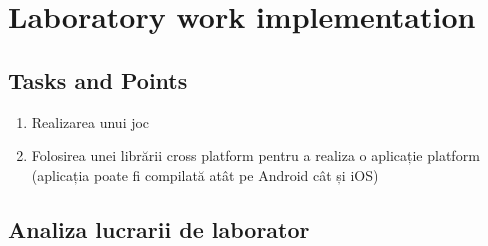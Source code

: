 \section{Laboratory work implementation}

\subsection{Tasks and Points}

\begin{enumerate}
\item Realizarea unui joc
\item Folosirea unei librării cross platform pentru a realiza o aplicație platform (aplicația poate fi compilată atât pe Android cât și iOS)
\end{enumerate}

\subsection{Analiza lucrarii de laborator}


